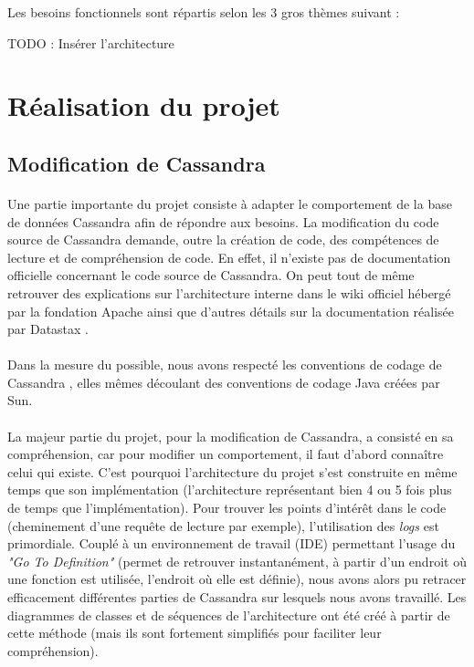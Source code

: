 \documentclass[12pt]{article}
\begin{document}
Les besoins fonctionnels sont répartis selon les 3 gros thèmes suivant :

TODO : Insérer l'architecture



\section{Réalisation du projet}

\subsection{Modification de Cassandra}

\paragraph{}Une partie importante du projet consiste à adapter le comportement de la base de données Cassandra afin de répondre aux besoins. La modification du code source de Cassandra demande, outre la création de code, des compétences de lecture et de compréhension de code. En effet, il n'existe pas de documentation officielle concernant le code source de Cassandra. On peut tout de même retrouver des explications sur l'architecture interne dans le wiki officiel hébergé par la fondation Apache \cite{CassArchi13} ainsi que d'autres détails sur la documentation réalisée par Datastax \cite{DatastaxDoc15}.

\paragraph{}Dans la mesure du possible, nous avons respecté les conventions de codage de Cassandra \cite{CassCodeStyle14}, elles mêmes découlant des conventions de codage Java créées par Sun.

\paragraph{}La majeur partie du projet, pour la modification de Cassandra, a consisté en sa compréhension, car pour modifier un comportement, il faut d'abord connaître celui qui existe. C'est pourquoi l'architecture du projet s'est construite en même temps que son implémentation (l'architecture représentant bien 4 ou 5 fois plus de temps que l'implémentation). Pour trouver les points d'intérêt dans le code (cheminement d'une requête de lecture par exemple), l'utilisation des \textit{logs} est primordiale. Couplé à un environnement de travail (IDE) permettant l'usage du \textit{"Go To Definition"} (permet de retrouver instantanément, à partir d'un endroit où une fonction est utilisée, l'endroit où elle est définie), nous avons alors pu retracer efficacement différentes parties de Cassandra sur lesquels nous avons travaillé. Les diagrammes de classes et de séquences de l'architecture ont été créé à partir de cette méthode (mais ils sont fortement simplifiés pour faciliter leur compréhension).
\end{document}

